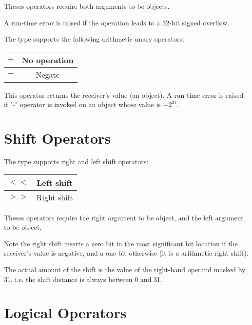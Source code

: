 Theses operators require both arguments to be  objects.\newline

A run-time error is raised if the operation leads to a 32-bit signed overflow.

The  type supports the following arithmetic unary operators:\newline

\begin{tabular}{|c|c|}
\hline
$+$ & No operation \\
\hline
$-$ & Negate \\
\hline
\end{tabular}

This operator returns the receiver's value (an  object). A run-time error is raised if "-" operator is invoked on an object whose value is $-2^{31}$.






\section{Shift Operators}


The  type supports right and left shift operators:\newline

\begin{tabular}{|c|c|}
\hline
$<<$ & Left shift \\
\hline
$>>$ & Right shift \\
\hline
\end{tabular}

Theses operators require the right argument to be  object, and the left argument to be  object.\newline

Note the right shift inserts a zero bit in the most significant bit location if the receiver's value is negative, and a one bit otherwise (it is a arithmetic right shift).\newline

The actual amount of the shift is the value of the right-hand operand masked by 31, i.e. the shift distance is always between 0 and 31.




\section{Logical Operators}

